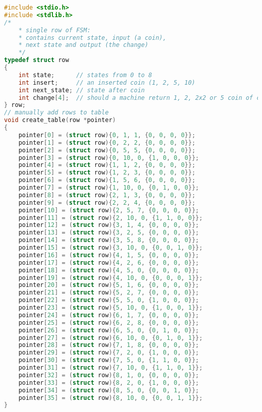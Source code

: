 \begin{lstlisting}[language=c, caption={Реализация первого конечного автомата}]
#include <stdio.h>
#include <stdlib.h>
/*
    * single row of FSM:
    * contains current state, input (a coin),
    * next state and output (the change)
    */
typedef struct row
{
    int state;      // states from 0 to 8
    int insert;     // an inserted coin (1, 2, 5, 10)
    int next_state; // state after coin
    int change[4];  // should a machine return 1, 2, 2x2 or 5 coin of change
} row;
// manually add rows to table
void create_table(row *pointer)
{
    pointer[0] = (struct row){0, 1, 1, {0, 0, 0, 0}};
    pointer[1] = (struct row){0, 2, 2, {0, 0, 0, 0}};
    pointer[2] = (struct row){0, 5, 5, {0, 0, 0, 0}};
    pointer[3] = (struct row){0, 10, 0, {1, 0, 0, 0}};
    pointer[4] = (struct row){1, 1, 2, {0, 0, 0, 0}};
    pointer[5] = (struct row){1, 2, 3, {0, 0, 0, 0}};
    pointer[6] = (struct row){1, 5, 6, {0, 0, 0, 0}};
    pointer[7] = (struct row){1, 10, 0, {0, 1, 0, 0}};
    pointer[8] = (struct row){2, 1, 3, {0, 0, 0, 0}};
    pointer[9] = (struct row){2, 2, 4, {0, 0, 0, 0}};
    pointer[10] = (struct row){2, 5, 7, {0, 0, 0, 0}};
    pointer[11] = (struct row){2, 10, 0, {1, 1, 0, 0}};
    pointer[12] = (struct row){3, 1, 4, {0, 0, 0, 0}};
    pointer[13] = (struct row){3, 2, 5, {0, 0, 0, 0}};
    pointer[14] = (struct row){3, 5, 8, {0, 0, 0, 0}};
    pointer[15] = (struct row){3, 10, 0, {0, 0, 1, 0}};
    pointer[16] = (struct row){4, 1, 5, {0, 0, 0, 0}};
    pointer[17] = (struct row){4, 2, 6, {0, 0, 0, 0}};
    pointer[18] = (struct row){4, 5, 0, {0, 0, 0, 0}};
    pointer[19] = (struct row){4, 10, 0, {0, 0, 0, 1}};
    pointer[20] = (struct row){5, 1, 6, {0, 0, 0, 0}};
    pointer[21] = (struct row){5, 2, 7, {0, 0, 0, 0}};
    pointer[22] = (struct row){5, 5, 0, {1, 0, 0, 0}};
    pointer[23] = (struct row){5, 10, 0, {1, 0, 0, 1}};
    pointer[24] = (struct row){6, 1, 7, {0, 0, 0, 0}};
    pointer[25] = (struct row){6, 2, 8, {0, 0, 0, 0}};
    pointer[26] = (struct row){6, 5, 0, {0, 1, 0, 0}};
    pointer[27] = (struct row){6, 10, 0, {0, 1, 0, 1}};
    pointer[28] = (struct row){7, 1, 8, {0, 0, 0, 0}};
    pointer[29] = (struct row){7, 2, 0, {1, 0, 0, 0}};
    pointer[30] = (struct row){7, 5, 0, {1, 1, 0, 0}};
    pointer[31] = (struct row){7, 10, 0, {1, 1, 0, 1}};
    pointer[32] = (struct row){8, 1, 0, {0, 0, 0, 0}};
    pointer[33] = (struct row){8, 2, 0, {1, 0, 0, 0}};
    pointer[34] = (struct row){8, 5, 0, {0, 0, 1, 0}};
    pointer[35] = (struct row){8, 10, 0, {0, 0, 1, 1}};
}


\end{lstlisting}
